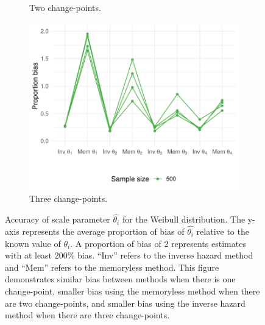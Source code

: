 \begin{appendix}
\begin{figure}[ht]
\begin{subfigure}[b]{0.45\textwidth}
         \caption{Two change-points.}
         \label{fig:weib2tplot}
     \end{subfigure}
     \begin{subfigure}[b]{0.70\textwidth}
         \centering
         \includegraphics[width=\textwidth]{weib3_tplot.pdf}
         \caption{Three change-points.}
         \label{fig:weib3tplot}
     \end{subfigure}
    \caption{Accuracy of scale parameter $\hat{\theta_i}$ for the Weibull distribution. The y-axis represents the average proportion of bias of $\hat{\theta_i}$ relative to the known value of $\theta_i$. A proportion of bias of 2 represents estimates with at least 200\% bias. ``Inv'' refers to the inverse hazard method and ``Mem'' refers to the memoryless method. This figure demonstrates similar bias between methods when there is one change-point, smaller bias using the memoryless method when there are two change-points, and smaller bias using the inverse hazard method when there are three change-points.}
    \label{fig:weibtplots}
\end{figure}

\end{appendix}